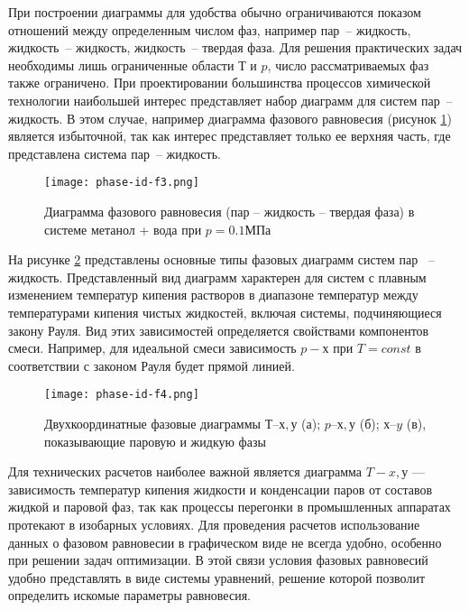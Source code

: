 При построении диаграммы для удобства обычно ограничиваются показом отношений между определенным числом фаз, например пар~-- жидкость, жидкость~-- жидкость, жидкость~-- твердая фаза. Для решения практических задач необходимы лишь ограниченные области $Т$ и $p$, число рассматриваемых фаз также ограничено. При проектировании большинства процессов химической технологии наибольшей интерес представляет набор диаграмм для систем пар~-- жидкость. В этом случае, например диаграмма фазового равновесия (рисунок \cref{fig:phase-id.f3}) является избыточной, так как интерес представляет только ее верхняя часть, где представлена система пар~-- жидкость. 

\begin{figure}
	\begin{center}
		\texttt{[image: phase-id-f3.png]}
	\end{center}
	\caption{Диаграмма фазового равновесия (пар – жидкость – твердая фаза) в системе метанол + вода при $p = 0.1 МПа$} \label{fig:phase-id.f3}
\end{figure}

На рисунке \cref{fig:phase-id.f4} представлены основные типы фазовых диаграмм систем пар ~-- жидкость. Представленный вид диаграмм характерен для систем с плавным изменением температур кипения растворов в диапазоне температур между температурами кипения чистых жидкостей, включая системы, подчиняющиеся закону Рауля. Вид этих зависимостей определяется свойствами компонентов смеси. Например, для идеальной смеси зависимость $p-х$ при $T=const$ в соответствии с законом Рауля будет прямой линией.

\begin{figure}
	\begin{center}
		\texttt{[image: phase-id-f4.png]}
	\end{center}
	\caption{Двухкоординатные фазовые диаграммы $Т – х, у$ (а); $p – х, у$ (б); $х – y$ (в), показывающие паровую и жидкую фазы} \label{fig:phase-id.f4}
\end{figure}

Для технических расчетов наиболее важной является диаграмма $T-x, у$ --- зависимость температур кипения жидкости и конденсации паров от составов жидкой и паровой фаз, так как процессы перегонки в промышленных аппаратах протекают в изобарных условиях. Для проведения расчетов использование данных о фазовом равновесии в графическом виде не всегда удобно, особенно при решении задач оптимизации. В этой связи условия фазовых равновесий удобно представлять в виде системы уравнений, решение которой позволит определить искомые параметры равновесия. 



